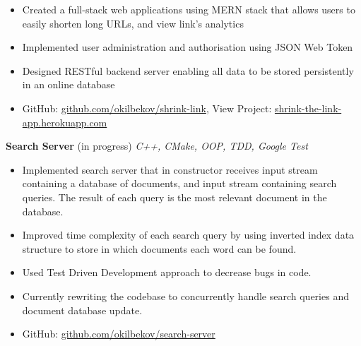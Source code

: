 \documentclass[a4paper]{article}
\begin{document}
\begin{itemize} \itemsep 1pt
	\item Created a full-stack web applications using MERN stack that allows users to easily shorten long URLs, and view link's analytics
	\vspace{-2mm}
	\item Implemented user administration and authorisation using JSON Web Token
	\vspace{-2mm}
	\item Designed RESTful backend server enabling all data to be stored persistently in an online database
	\vspace{-2mm}
	\item GitHub: \href{https://github.com/okilbekov/shrink-link}{github.com/okilbekov/shrink-link}, View Project: \href{https://shrink-the-link-app.herokuapp.com}{shrink-the-link-app.herokuapp.com}
\end{itemize}
{\textbf{Search Server}} (in progress) {\sl C++, CMake, OOP, TDD, Google Test} \\
\vspace{-2mm}
\begin{itemize} \itemsep 1pt
	\item Implemented search server that in constructor receives input stream containing a database of documents, and input stream containing search queries. The result of each query is the most relevant document in the database.
	\vspace{-2mm}
	\item Improved time complexity of each search query by using inverted index data structure to store in which documents each word can be found.
	\vspace{-2mm}
	\item  Used Test Driven Development approach to decrease bugs in code.
	\vspace{-2mm}
	\item Currently rewriting the codebase to concurrently handle search queries and document database update.
	\vspace{-2mm}
	\item GitHub: \href{https://github.com/okilbekov/search-server}{github.com/okilbekov/search-server}
\end{itemize}
\end{document}

